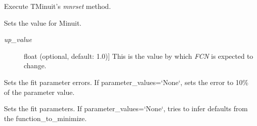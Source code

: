 \documentclass[a4paper,10pt,english]{sphinxmanual}
\begin{document}
\begin{fulllineitems}
\begin{fulllineitems}
\begin{description}
\end{description}

\end{fulllineitems}


\begin{fulllineitems}
\label{module_doc:kafe.minuit.Minuit.reset}
Execute TMinuit's \emph{mnrset} method.

\end{fulllineitems}


\begin{fulllineitems}
\label{module_doc:kafe.minuit.Minuit.set_err}
Sets the  value for Minuit.
\begin{description}
\item[{\emph{up\_value}}] \leavevmode{[}float (optional, default: 1.0){]}
This is the value by which \emph{FCN} is expected to change.

\end{description}

\end{fulllineitems}


\begin{fulllineitems}
\label{module_doc:kafe.minuit.Minuit.set_parameter_errors}
Sets the fit parameter errors. If parameter\_values={}`None{}`, sets the
error to 10\% of the parameter value.

\end{fulllineitems}


\begin{fulllineitems}
\label{module_doc:kafe.minuit.Minuit.set_parameter_names}
Sets the fit parameters. If parameter\_values={}`None{}`, tries to infer
defaults from the function\_to\_minimize.

\end{fulllineitems}



\end{fulllineitems}
\end{document}
